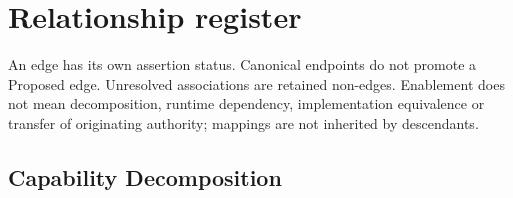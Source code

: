 \chapter{Relationship register}\label{model:relationships}
An edge has its own assertion status. Canonical endpoints do not promote a Proposed edge. Unresolved associations are retained non-edges. Enablement does not mean decomposition, runtime dependency, implementation equivalence or transfer of originating authority; mappings are not inherited by descendants.

\section{Capability Decomposition}
\begingroup\small\setlength{\TableWidth}{\dimexpr\linewidth-6\tabcolsep-4\arrayrulewidth\relax}
